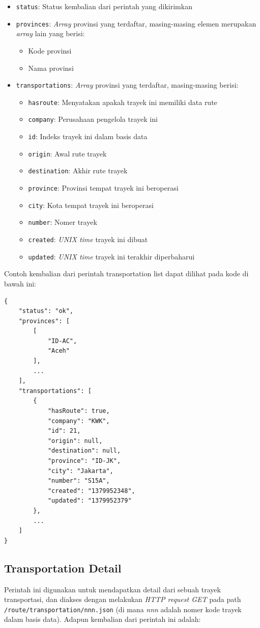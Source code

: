 \begin{itemize}
	\item \texttt{status}: Status kembalian dari perintah yang dikirimkan
	\item \texttt{provinces}: \textit{Array} provinsi yang terdaftar, masing-masing elemen merupakan \textit{array} lain yang berisi:
		\begin{itemize}
			\item Kode provinsi
			\item Nama provinsi
		\end{itemize}
	\item \texttt{transportations}: \textit{Array} provinsi yang terdaftar, masing-masing berisi:
		\begin{itemize}
			\item \texttt{hasroute}: Menyatakan apakah trayek ini memiliki data rute
			\item \texttt{company}: Perusahaan pengelola trayek ini
			\item \texttt{id}: Indeks trayek ini dalam basis data
			\item \texttt{origin}: Awal rute trayek
			\item \texttt{destination}: Akhir rute trayek
			\item \texttt{province}: Provinsi tempat trayek ini beroperasi
			\item \texttt{city}: Kota tempat trayek ini beroperasi
			\item \texttt{number}: Nomer trayek
			\item \texttt{created}: \textit{UNIX time} trayek ini dibuat
			\item \texttt{updated}: \textit{UNIX time} trayek ini terakhir diperbaharui
		\end{itemize}
\end{itemize}

Contoh kembalian dari perintah transportation list dapat dilihat pada kode di bawah ini:

\begin{lstlisting}
{
	"status": "ok",
	"provinces": [
		[
			"ID-AC",
			"Aceh"
		],
		...
	],
	"transportations": [
		{
			"hasRoute": true,
			"company": "KWK",
			"id": 21,
			"origin": null,
			"destination": null,
			"province": "ID-JK",
			"city": "Jakarta",
			"number": "S15A",
			"created": "1379952348",
			"updated": "1379952379"
		},
		...
	]
}
\end{lstlisting}

\subsection{Transportation Detail}
Perintah ini digunakan untuk mendapatkan detail dari sebuah trayek transportasi, dan diakses dengan melakukan \textit{HTTP request GET} pada path \texttt{/route/transportation/nnn.json} (di mana \textit{nnn} adalah nomer kode trayek dalam basis data). Adapun kembalian dari perintah ini adalah:

